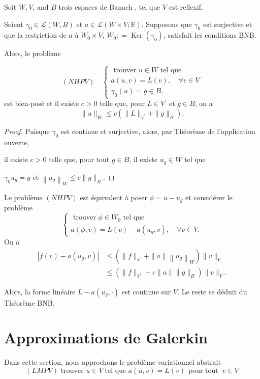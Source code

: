 \begin{proposition}\label{nonH}
Soit  $W, V$, and $B$ trois espaces de Banach , tel que $V$  est reflexif.  

Soient $\gamma_{0} \in \mathcal{L}(W ,B)$ et  $a \in \mathcal{L}(W \times V ; \mathbb{R}) .$ Supposons que  $\gamma_{0}$ est  surjective et que la  restriction de  $a$ à  $W_{0}\times V$, $W_{0} : =\operatorname{Ker}\left(\gamma_{0}\right)$,   satisfait les  conditions  BNB.  

Alors, le problème 

$$
(NHPV)\quad \left\{\begin{array}{l}
	\text { trouver  } u \in W \text { tel que} \\
	a(u, v)=L(v), \quad \forall v\in V\\
	\gamma_0(u)=g\in B,
\end{array}\right.
$$
est bien-posé et il existe  $c>0$ telle que, pour $L \in V^{\prime}$ et  $g \in B$, on a 
	$$
	\|u\|_{W} \leq c\left(\|L\|_{V^{\prime}}+\|g\|_{B}\right).
	$$
	
\end{proposition}

\begin{proof}
Puisque $\gamma_{0}$ est continue et  surjective,  alors, par Théorème de l'application ouverte, 

il  existe $c>0$ telle que,  pour tout  $g \in B$,  
il existe  $u_{g} \in W$  tel  que  

$\gamma_{0} u_{g}=g$  et $\left\|u_{g}\right\|_{W} \leq c\|g\|_{B}$. 
\end{proof}


Le problème $(NHPV)$ est équivalent à poser  $\phi=u-u_{g}$ et considérer le  problème 
$$
\left\{\begin{array}{l}
	\text { trouver  } \phi \in W_{0} \text { tel que} \\
	a(\phi, v)=L(v)-a\left(u_{g}, v\right), \quad \forall v \in V.
\end{array}\right.
$$
On a 
$$
\begin{aligned}
	\left|f(v)-a\left(u_{g}, v\right)\right| & \leq\left(\|f\|_{V^{\prime}}+\|a\|\left\|u_{g}\right\|_{W}\right)\|v\|_{V} \\
	& \leq\left(\|f\|_{V^{\prime}}+c\|a\|\|g\|_{B}\right)\|v\|_{V}.
\end{aligned}
$$

Alors, 
la forme  linéaire $L-a\left(u_{g}, \cdot\right)$ est continue sur $V$.  Le reste se déduit du Théorème BNB.
\section{Approximations de Galerkin}
Dans cette section, nous approchons le problème variationnel abstrait 
$$
(LMPV) \text{ trouver } u \in V\;  \text{tel que } a(u, v)=L(v) \;\, \text{pour tout}\;\;  v \in V
$$

